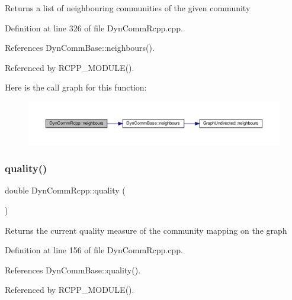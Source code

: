 \begin{DoxyReturn}{Returns}
a list of neighbouring communities of the given community 
\end{DoxyReturn}


Definition at line 326 of file Dyn\+Comm\+Rcpp.\+cpp.



References Dyn\+Comm\+Base\+::neighbours().



Referenced by R\+C\+P\+P\+\_\+\+M\+O\+D\+U\+L\+E().

Here is the call graph for this function\+:
\nopagebreak
\begin{figure}[H]
\begin{center}
\leavevmode
\includegraphics[width=350pt]{classDynCommRcpp_abbda8cc950c360c1b89859ebe9233535_cgraph}
\end{center}
\end{figure}
\mbox{\label{classDynCommRcpp_a3d9d6845d9e67941da187bca511cdfcf}} 
\subsubsection{\texorpdfstring{quality()}{quality()}}
{\footnotesize\ttfamily double Dyn\+Comm\+Rcpp\+::quality (\begin{DoxyParamCaption}{ }\end{DoxyParamCaption})\hspace{0.3cm}{\ttfamily [inline]}}

\begin{DoxyReturn}{Returns}
the current quality measure of the community mapping on the graph 
\end{DoxyReturn}


Definition at line 156 of file Dyn\+Comm\+Rcpp.\+cpp.



References Dyn\+Comm\+Base\+::quality().



Referenced by R\+C\+P\+P\+\_\+\+M\+O\+D\+U\+L\+E().

